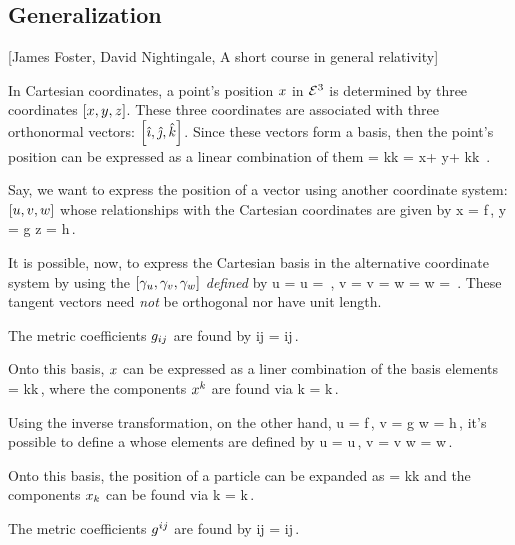 \subsection{Generalization}
[James Foster, David Nightingale, A short course in general relativity]

In Cartesian coordinates, a point's position $x$ in $\mathcal{E}^{3}$ is determined by three coordinates $\left[{x,y,z}\right]$. These three coordinates are associated with three orthonormal vectors: $\left[{\hat{\imath}, \hat{\jmath}, \hat{k}}\right]$. Since these vectors form a basis, then the point's position can be expressed as a linear combination of them
\beq
\pvec = \ifvec k\comp\pvec k = x\nvec\imath + y\nvec\jmath + k\nvec k \,.
\eeq

Say, we want to express the position of a vector using another coordinate system: $\left[{u,v,w}\right]$ whose relationships with the Cartesian coordinates are given by
\beq
x = f\,,\qquad 
y = g\qquad{}\qquad 
z = h\,.
\eeq

It is possible, now, to express the Cartesian basis in the alternative coordinate system by using the  $\left[{\gamma_u, \gamma_v, \gamma_w}\right]$ \emph{defined} by
\beq
\ifvec u = \cder\pvec u = \,,\qquad
\ifvec v = \cder\pvec v = \qquad{}\qquad
\ifvec w = \cder\pvec w = \,.
\eeq
These tangent vectors need \emph{not} be orthogonal nor have unit length.

The metric coefficients $g_{{i}{j}}$ are found by
\beq
\imet ij = \ifvec i\iprod\ifvec j\,.
\eeq

Onto this basis, $x$ can be expressed as a liner combination of the basis elements
\beq
\pvec = \comp\pvec k\ifvec k\,,
\eeq
where the components ${x}^{k}$ are found via
\beq
\comp\pvec k = \pvec\iprod\ifvec k\,.
\eeq

Using the inverse transformation, on the other hand,
\beq
u = f\,,\qquad 
v = g\qquad{}\qquad 
w = h\,,
\eeq
it's possible to define a  whose elements are defined by
\beq
\rfvec u = \grad u\,,\qquad
\rfvec v = \grad v\qquad{}\qquad 
\rfvec w = \grad w\,.
\eeq

Onto this basis, the position of a particle can be expanded as
\beq
\pvec = \rcomp\pvec k\rfvec k
\eeq
and the components ${x}_{k}$ can be found via
\beq
\rcomp\pvec k = \pvec\iprod\rfvec k\,.
\eeq

The metric coefficients $g^{{i}{j}}$ are found by
\beq
\rmet ij = \rfvec i\iprod\rfvec j\,.
\eeq

